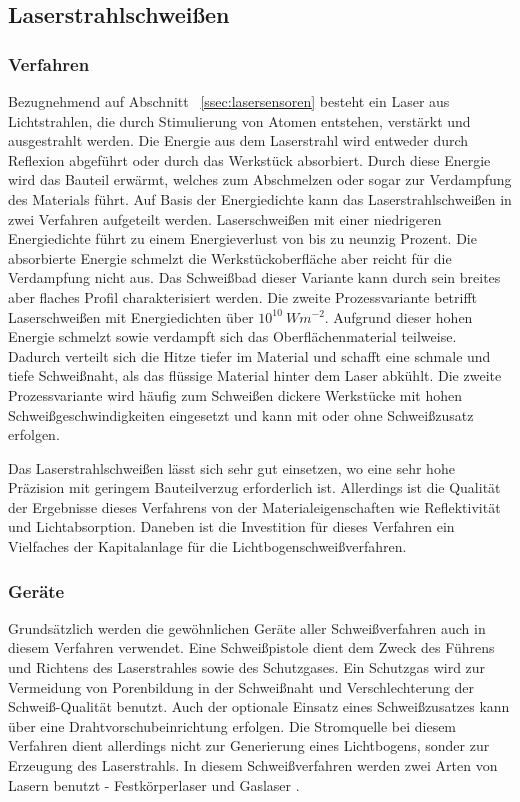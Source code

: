 \subsection{Laserstrahlschweißen}
\subsubsection{Verfahren}
Bezugnehmend auf Abschnitt ~\ref{ssec:lasersensoren} besteht ein Laser aus Lichtstrahlen, die durch Stimulierung von Atomen entstehen, verstärkt und ausgestrahlt werden. Die Energie aus dem Laserstrahl wird entweder durch Reflexion abgeführt oder durch das Werkstück absorbiert. Durch diese Energie wird das Bauteil erwärmt, welches zum Abschmelzen oder sogar zur Verdampfung des Materials führt. Auf Basis der Energiedichte kann das Laserstrahlschweißen in zwei Verfahren aufgeteilt werden. Laserschweißen mit einer niedrigeren Energiedichte führt zu einem Energieverlust von bis zu neunzig Prozent. Die absorbierte Energie schmelzt die Werkstückoberfläche aber reicht für die Verdampfung nicht aus. Das Schweißbad dieser Variante kann durch sein breites aber flaches Profil charakterisiert werden. Die zweite Prozessvariante betrifft Laserschweißen mit Energiedichten über $10^{10}\ Wm^{-2}$. Aufgrund dieser hohen Energie schmelzt sowie verdampft sich das Oberflächenmaterial teilweise. Dadurch verteilt sich die Hitze tiefer im Material und schafft eine schmale und tiefe Schweißnaht, als das flüssige Material hinter dem Laser abkühlt. Die zweite Prozessvariante wird häufig zum Schweißen dickere Werkstücke mit hohen Schweißgeschwindigkeiten eingesetzt und kann mit oder ohne Schweißzusatz erfolgen. \autocite[45-47]{Pires_WeldingRobots_2006}

Das Laserstrahlschweißen lässt sich sehr gut einsetzen, wo eine sehr hohe Präzision mit geringem Bauteilverzug erforderlich ist. Allerdings ist die Qualität der Ergebnisse dieses Verfahrens von der Materialeigenschaften wie Reflektivität und Lichtabsorption. Daneben ist die Investition für dieses Verfahren ein Vielfaches der Kapitalanlage für die Lichtbogenschweißverfahren. \autocite[47]{Pires_WeldingRobots_2006}

\subsubsection{Geräte}
Grundsätzlich werden die gewöhnlichen Geräte aller Schweißverfahren auch in diesem Verfahren verwendet. Eine Schweißpistole dient dem Zweck des Führens und Richtens des Laserstrahles sowie des Schutzgases. Ein Schutzgas wird zur Vermeidung von Porenbildung in der Schweißnaht und Verschlechterung der Schweiß-Qualität benutzt. Auch der optionale Einsatz eines Schweißzusatzes kann über eine Drahtvorschubeinrichtung erfolgen. Die Stromquelle bei diesem Verfahren dient allerdings nicht zur Generierung eines Lichtbogens, sonder zur Erzeugung des Laserstrahls. In diesem Schweißverfahren werden zwei Arten von Lasern benutzt - Festkörperlaser und Gaslaser \autocite[47]{Pires_WeldingRobots_2006}.

